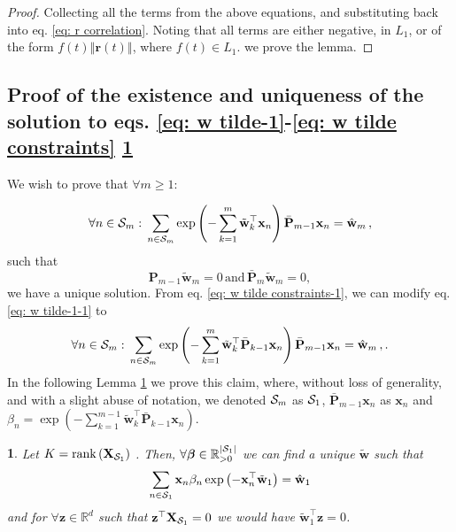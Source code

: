 \documentclass[twoside,11pt,english]{article}
\newtheorem{lem}[thm]{\protect\lemmaname}
\providecommand{\lemmaname}{Lemma}
\providecommand{\lemmaname}{Lemma}
\begin{document}
{\begin{proof}
Collecting all the terms from the above equations, and substituting
back into eq. \ref{eq: r correlation}. Noting that all terms are
either negative, in $L_{1}$, or of the form $f\left(t\right)\left\Vert \mathbf{r}\left(t\right)\right\Vert $,
where $f\left(t\right)\in L_{1}$. we prove the lemma.
\end{proof}

\subsection{Proof of the existence and uniqueness of the solution to eqs. \ref{eq: w tilde-1}-\ref{eq: w tilde constraints}
\ref{lem: existence of solutions}\label{subsec: existence 1}}

We wish to prove that $\forall m\geq1:$

\begin{equation}
\forall n\in\mathcal{S}_{m}:\,\sum_{n\in\mathcal{S}_{m}}\exp\left(-\sum_{k=1}^{m}\tilde{\mathbf{w}}_{k}^{\top}\mathbf{x}_{n}\right)\bar{\mathbf{P}}_{m-1}\mathbf{x}_{n}=\hat{\mathbf{w}}_{m}\,,\label{eq: w tilde-1-1}
\end{equation}
such that 
\begin{equation}
\mathbf{P}_{m-1}\tilde{\mathbf{w}}_{m}=0\,\mathrm{and}\,\bar{\mathbf{P}}_{m}\tilde{\mathbf{w}}_{m}=0,\label{eq: w tilde constraints-1}
\end{equation}
we have a unique solution. From eq. \ref{eq: w tilde constraints-1},
we can modify eq. \ref{eq: w tilde-1-1} to 
\[
\forall n\in\mathcal{S}_{m}:\,\sum_{n\in\mathcal{S}_{m}}\exp\left(-\sum_{k=1}^{m}\tilde{\mathbf{w}}_{k}^{\top}\bar{\mathbf{P}}_{k-1}\mathbf{x}_{n}\right)\bar{\mathbf{P}}_{m-1}\mathbf{x}_{n}=\hat{\mathbf{w}}_{m}\,,.
\]
In the following Lemma \ref{lem: existence of solutions} we prove
this claim, where, without loss of generality, and with a slight abuse
of notation, we denoted $\mathcal{S}_{m}$ as $\mathcal{S}_{1}$, $\bar{\mathbf{P}}_{m-1}\mathbf{x}_{n}$
as $\mathbf{x}_{n}$ and $\beta_{n}=\exp\left(-\sum_{k=1}^{m-1}\tilde{\mathbf{w}}_{k}^{\top}\bar{\mathbf{P}}_{k-1}\mathbf{x}_{n}\right)$.
\begin{lem}
Let $K=\mathrm{rank}\left(\mathbf{X}_{\mathcal{S}_{1}}\right)$ . Then, $\forall\boldsymbol{\beta}\in\mathbb{R}_{>0}^{\left|\mathcal{S}_{1}\right|}$
we can find a unique $\tilde{\mathbf{w}}$ such that 
\begin{equation}
\sum_{n\in\mathcal{S}_{1}}\mathbf{x}_{n}\beta_{n}\exp\left(-\mathbf{x}_{n}^{\top}\tilde{\mathbf{w}}_{1}\right)=\hat{\mathbf{w}}_{1}\label{eq: w_tilde equation}
\end{equation}
and for $\forall\mathbf{z}\in\mathbb{R}^{d}$ such that $\mathbf{z}^{\top}\mathbf{X}_{\mathcal{S}_{1}}=0$
we would have $\tilde{\mathbf{w}}_{1}^{\top}\mathbf{z}=0$.\label{lem: existence of solutions} 
\end{lem}

}
\end{document}
